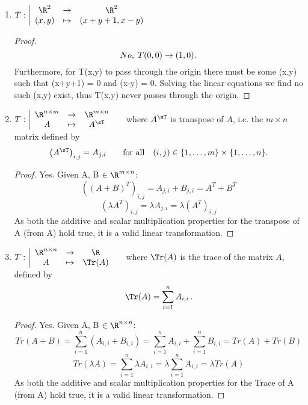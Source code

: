 \documentclass[11pt,nocut]{article}
\begin{document}
\begin{problem}[2 points]
\begin{enumerate}[label=\normalfont(\textbf{\alph*})]
\begin{proof}
\end{proof}
		
		\item 
			$\displaystyle
			T: \left| 
			\begin{array}{ccc}
				\R^2 & \to & \R^2 \\
				(x,y) & \mapsto & (x+y+1, x-y)
			\end{array}
		\right.
		$\\
		
\begin{proof}
		$$
		No, \hspace{1mm} T(0,0) \to (1,0). 
		$$
		Furthermore, for T(x,y) to pass through the origin there must be some (x,y) such that (x+y+1) = 0 and (x-y) = 0. Solving the linear equations we find no such (x,y) exist, thus T(x,y) never passes through the origin.
\end{proof}
		
	\item 
			$\displaystyle
			T: \left| 
			\begin{array}{ccc}
				\R^{n \times m} & \to & \R^{m \times n} \\
				A & \mapsto & A^{\sT}
			\end{array}
		\right.
		\quad$ where $A^{\sT}$ is transpose of $A$, i.e. the $m \times n$ matrix defined by
		$$
		\big(A^{\sT}\big)_{i,j} = A_{j,i} \qquad \text{for all} \quad (i,j) \in \{1, \dots, m\}\times \{1, \dots, n\}.
		$$
		
\begin{proof}
		Yes. Given A, B $\in \R^{m \times n}$:
		$$
		((A+B)^T)_{i,j} = A_{j,i}+B_{j,i} = A^T + B^T
		$$
		$$
		(\lambda A^T)_{i,j} = \lambda A_{j,i} = \lambda (A^T)_{i,j}
		$$
		As both the additive and scalar multiplication properties for the transpose of A (from A) hold true, it is a valid linear transformation.
\end{proof}
		
	\item 
			$\displaystyle
			T: \left| 
			\begin{array}{ccc}
				\R^{n \times n} & \to & \R \\
				A & \mapsto & \Tr(A)
			\end{array}
		\right.\quad$ where $\Tr(A)$ is the trace of the matrix $A$, defined by 
		$$\Tr(A) = \sum_{i=1}^n A_{i,i} \,.$$
		
\begin{proof}
		Yes. Given A, B $\in \R^{n \times n}$:
		$$
		Tr(A+B) = \sum_{i=1}^n (A_{i,i}+B_{i,i}) = \sum_{i=1}^n A_{i,i} + \sum_{i=1}^n B_{i,i} = Tr(A) + Tr(B)
		$$
		$$
		Tr(\lambda A) = \sum_{i=1}^n \lambda A_{i,i} = \lambda \sum_{i=1}^n A_{i,i}  = \lambda Tr(A)
		$$
		As both the additive and scalar multiplication properties for the Trace of A (from A) hold true, it is a valid linear transformation.
\end{proof}
		
	\end{enumerate}
\end{problem}
\end{document}
